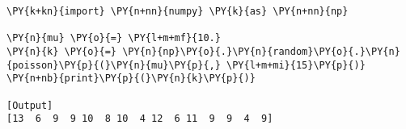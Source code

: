 \begin{Verbatim}[label=\makebox{\href{https://bitbucket.org/lbaldini/statnotes/src/master/snippets/np.random.poisson.py}{https://bitbucket.org/.../np.random.poisson.py}},commandchars=\\\{\}]
\PY{k+kn}{import} \PY{n+nn}{numpy} \PY{k}{as} \PY{n+nn}{np}

\PY{n}{mu} \PY{o}{=} \PY{l+m+mf}{10.}
\PY{n}{k} \PY{o}{=} \PY{n}{np}\PY{o}{.}\PY{n}{random}\PY{o}{.}\PY{n}{poisson}\PY{p}{(}\PY{n}{mu}\PY{p}{,} \PY{l+m+mi}{15}\PY{p}{)}
\PY{n+nb}{print}\PY{p}{(}\PY{n}{k}\PY{p}{)}

[Output]
[13  6  9  9 10  8 10  4 12  6 11  9  9  4  9]
\end{Verbatim}